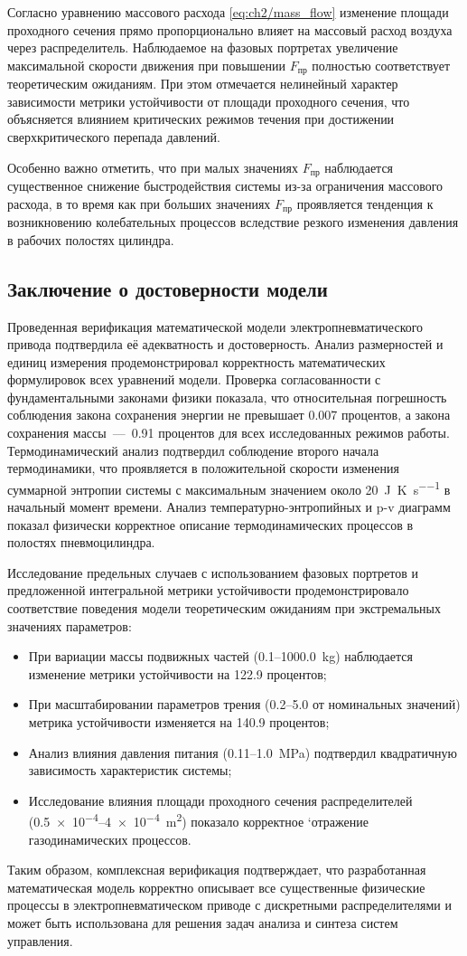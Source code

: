Согласно уравнению массового расхода \ref{eq:ch2/mass_flow} изменение площади проходного сечения прямо пропорционально
влияет на массовый расход воздуха через распределитель. Наблюдаемое на фазовых портретах увеличение максимальной
скорости движения при повышении $F_\text{пр}$ полностью соответствует теоретическим ожиданиям.
При этом отмечается нелинейный характер зависимости метрики устойчивости от площади проходного сечения,
что объясняется влиянием критических режимов течения при достижении сверхкритического перепада давлений.

Особенно важно отметить, что при малых значениях $F_\text{пр}$ наблюдается
существенное снижение быстродействия системы из-за ограничения массового расхода,
в то время как при больших значениях $F_\text{пр}$ проявляется тенденция к возникновению колебательных
процессов вследствие резкого изменения давления в рабочих полостях цилиндра.

\subsection{Заключение о достоверности модели}\label{sec:ch2/sec7/subsec5}

Проведенная верификация математической модели электропневматического привода подтвердила её адекватность и достоверность.
Анализ размерностей и единиц измерения продемонстрировал корректность математических формулировок всех уравнений модели.
Проверка согласованности с фундаментальными законами физики показала, что относительная погрешность соблюдения
закона сохранения энергии не превышает \num{0.007} процентов, а закона сохранения массы~---~\num{0.91} процентов
для всех исследованных режимов работы.
Термодинамический анализ подтвердил соблюдение второго начала термодинамики,
что проявляется в положительной скорости изменения суммарной энтропии системы с максимальным значением
около \SI{20}{\joule\per\kelvin\per\second} в начальный момент времени. Анализ температурно-энтропийных
и p-v диаграмм показал физически корректное описание термодинамических процессов в полостях пневмоцилиндра.

Исследование предельных случаев с использованием фазовых портретов и
предложенной интегральной метрики устойчивости продемонстрировало соответствие поведения
модели теоретическим ожиданиям при экстремальных значениях параметров:
\begin{itemize}
\item При вариации массы подвижных частей (\num{0.1}--\SI{1000.0}{\kilo\gram}) наблюдается изменение метрики устойчивости на \num{122.9} процентов;
\item При масштабировании параметров трения (\num{0.2}--\num{5.0} от номинальных значений) метрика устойчивости изменяется на \num{140.9} процентов;
\item Анализ влияния давления питания (\num{0.11}--\SI{1.0}{\mega\pascal}) подтвердил квадратичную зависимость характеристик системы;
\item Исследование влияния площади проходного сечения распределителей (\num{0.5e-4}--\SI{4e-4}{\metre\squared}) показало корректное
`отражение газодинамических процессов.
\end{itemize}

Таким образом, комплексная верификация подтверждает, что разработанная математическая модель
корректно описывает все существенные физические процессы в электропневматическом приводе с
дискретными распределителями и может быть использована для решения задач анализа и синтеза систем управления.
